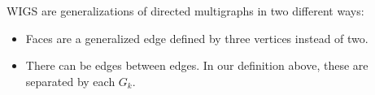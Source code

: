 WIGS are generalizations of directed multigraphs in two different ways:
\begin{itemize}
  \item Faces are a generalized edge defined by three vertices instead of two.
  \item There can be edges between edges. In our definition above, these are separated by each $G_{k}.$
\end{itemize}

